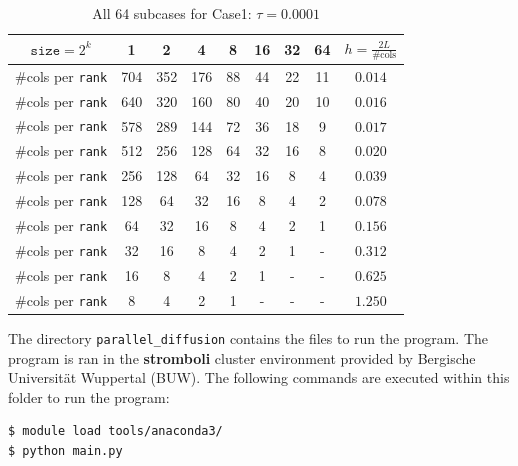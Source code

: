 \begin{table}[H]
    \centering
    \begin{tabular}{|c|c|c|c|c|c|c|c|c|}
        \hline
        $\texttt{size}=2^k$ & 1 & 2 & 4 & 8 & 16 & 32 & 64 & $h = \frac{2L}{\text{\#cols}}$\\
        \hline
        \#cols per \texttt{rank} & 704 & 352 & 176 & 88 & 44 & 22 & 11 & $0.014$ \\ 
        \hline
        \#cols per \texttt{rank} & 640 & 320 & 160 & 80 & 40 & 20 & 10 & $0.016$ \\ 
        \hline
        \#cols per \texttt{rank} & 578 & 289 & 144 & 72 & 36 & 18 & 9 & $0.017$ \\ 
        \hline
        \#cols per \texttt{rank} & 512 & 256 & 128 & 64 & 32 & 16 & 8 & $0.020$ \\ 
        \hline
        \#cols per \texttt{rank} & 256 & 128 & 64 & 32 & 16 & 8 & 4 & $0.039$ \\ 
        \hline
        \#cols per \texttt{rank} & 128 & 64 & 32 & 16 & 8 & 4 & 2 & $0.078$ \\ 
        \hline
        \#cols per \texttt{rank} & 64 & 32 & 16 & 8 & 4 & 2 & 1 & $0.156$ \\ 
        \hline
        \#cols per \texttt{rank} & 32 & 16 & 8 & 4 & 2 & 1 & - & $0.312$ \\ 
        \hline
        \#cols per \texttt{rank} & 16 & 8 & 4 & 2 & 1 & - & - & $0.625$ \\ 
        \hline
        \#cols per \texttt{rank} & 8 & 4 & 2 & 1 & - & - & - & $1.250$ \\ 
        \hline
    \end{tabular}
    \caption{All 64 subcases for Case1: $\tau=0.0001$}
\end{table}

The directory \texttt{parallel\_diffusion} contains the files to run the program. The program is ran in the \textbf{stromboli} cluster environment provided by Bergische Universität Wuppertal (BUW). The following commands are executed within this folder to run the program:
\begin{lstlisting}[language=sh]
$ module load tools/anaconda3/
$ python main.py
\end{lstlisting}

